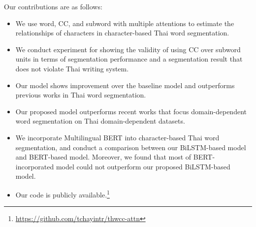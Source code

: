 Our contributions are as follows:
%
\begin{itemize}
    \setlength\itemsep{0.01em}
    \item We use word, CC, and subword with multiple attentions to estimate the relationships of characters in character-based Thai word segmentation.
    \item We conduct experiment for showing the validity of using CC over subword units in terms of segmentation performance and a segmentation result that does not violate Thai writing system.
    \item Our model shows improvement over the baseline model and outperforms previous works in Thai word segmentation.
    \item Our proposed model outperforms recent works that focus domain-dependent word segmentation on Thai domain-dependent datasets.
    \item We incorporate Multilingual BERT into character-based Thai word segmentation, and conduct a comparison between our BiLSTM-based model and BERT-based model. Moreover, we found that most of BERT-incorporated model could not outperform our proposed BiLSTM-based model.
    \item Our code is publicly available.\footnote{\url{https://github.com/tchayintr/thwcc-attn}}
\end{itemize}